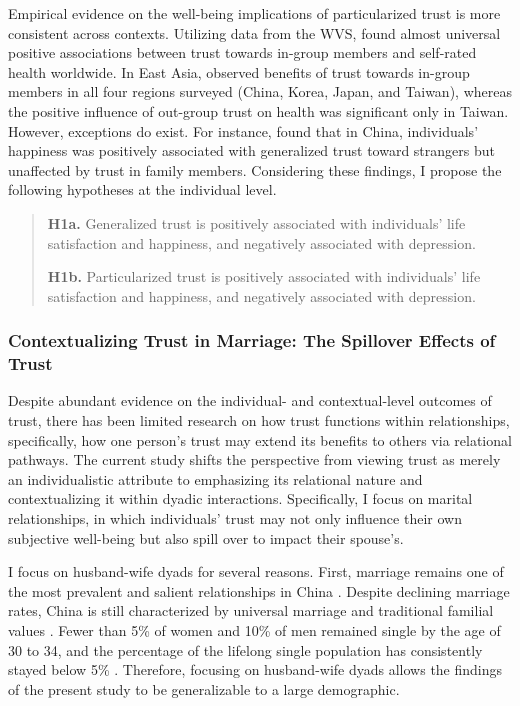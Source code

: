 Empirical evidence on the well-being implications of particularized trust is more consistent across contexts. Utilizing data from the WVS, \textcite{sungTrustHealthCrossnational2019} found almost universal positive associations between trust towards in-group members and self-rated health worldwide. In East Asia, \textcite{sungIngroupTrustSelfrated2020} observed benefits of trust towards in-group members in all four regions surveyed (China, Korea, Japan, and Taiwan), whereas the positive influence of out-group trust on health was significant only in Taiwan. However, exceptions do exist. For instance, \textcite{baiSocialTrustPattern2019} found that in China, individuals' happiness was positively associated with generalized trust toward strangers but unaffected by trust in family members.
Considering these findings, I propose the following hypotheses at the individual level.

\begin{quote}
    \textbf{H1a.} Generalized trust is positively associated with individuals' life satisfaction and happiness, and negatively associated with depression.

    \textbf{H1b.} Particularized trust is positively associated with individuals' life satisfaction and happiness, and negatively associated with depression.
\end{quote}

\subsubsection{Contextualizing Trust in Marriage: The Spillover Effects of Trust}

Despite abundant evidence on the individual- and contextual-level outcomes of trust, there has been limited research on how trust functions within relationships, specifically, how one person's trust may extend its benefits to others via relational pathways. The current study shifts the perspective from viewing trust as merely an individualistic attribute to emphasizing its relational nature and contextualizing it within dyadic interactions. Specifically, I focus on marital relationships, in which individuals' trust may not only influence their own subjective well-being but also spill over to impact their spouse's.

I focus on husband-wife dyads for several reasons. First, marriage remains one of the most prevalent and salient relationships in China \parencite{jiangMarriageSqueezeNeverMarried2014,yanChineseFamiliesUpside2021}. Despite declining marriage rates, China is still characterized by universal marriage and traditional familial values \parencite{jiHeterogeneityContemporaryChinese2014}. Fewer than 5\% of women and 10\% of men remained single by the age of 30 to 34, and the percentage of the lifelong single population has consistently stayed below 5\% \parencite{jiangMarriageSqueezeNeverMarried2014}. Therefore, focusing on husband-wife dyads allows the findings of the present study to be generalizable to a large demographic.


